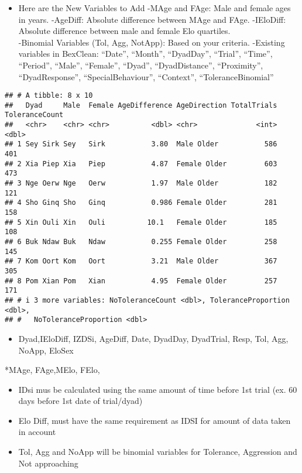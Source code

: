 \documentclass[
]{article}
\providecommand{\tightlist}{%
  \setlength{\itemsep}{0pt}\setlength{\parskip}{0pt}}
\begin{document}
\begin{itemize}
\tightlist
\item
  Here are the New Variables to Add -MAge and FAge: Male and female ages
  in years. -AgeDiff: Absolute difference between MAge and FAge.
  -IEloDiff: Absolute difference between male and female Elo
  quartiles.\\
  -Binomial Variables (Tol, Agg, NotApp): Based on your criteria.
  -Existing variables in BexClean: ``Date'', ``Month'', ``DyadDay'',
  ``Trial'', ``Time'', ``Period'', ``Male'', ``Female'', ``Dyad'',
  ``DyadDistance'', ``Proximity'', ``DyadResponse'',
  ``SpecialBehaviour'', ``Context'', ``ToleranceBinomial''
\end{itemize}

\begin{verbatim}
## # A tibble: 8 x 10
##   Dyad     Male  Female AgeDifference AgeDirection TotalTrials ToleranceCount
##   <chr>    <chr> <chr>          <dbl> <chr>              <int>          <dbl>
## 1 Sey Sirk Sey   Sirk           3.80  Male Older           586            401
## 2 Xia Piep Xia   Piep           4.87  Female Older         603            473
## 3 Nge Oerw Nge   Oerw           1.97  Male Older           182            121
## 4 Sho Ginq Sho   Ginq           0.986 Female Older         281            158
## 5 Xin Ouli Xin   Ouli          10.1   Female Older         185            108
## 6 Buk Ndaw Buk   Ndaw           0.255 Female Older         258            145
## 7 Kom Oort Kom   Oort           3.21  Male Older           367            305
## 8 Pom Xian Pom   Xian           4.95  Female Older         257            171
## # i 3 more variables: NoToleranceCount <dbl>, ToleranceProportion <dbl>,
## #   NoToleranceProportion <dbl>
\end{verbatim}

\begin{itemize}
\tightlist
\item
  Dyad,IEloDiff, IZDSi, AgeDiff, Date, DyadDay, DyadTrial, Resp, Tol,
  Agg, NoApp, EloSex
\end{itemize}

*MAge, FAge,MElo, FElo,

\begin{itemize}
\tightlist
\item
  IDsi mus be calculated using the same amount of time before 1st trial
  (ex. 60 days before 1st date of trial/dyad)
\item
  Elo Diff, must have the same requirement as IDSI for amount of data
  taken in account
\item
  Tol, Agg and NoApp will be binomial variables for Tolerance,
  Aggression and Not approaching
\end{itemize}
\end{document}

